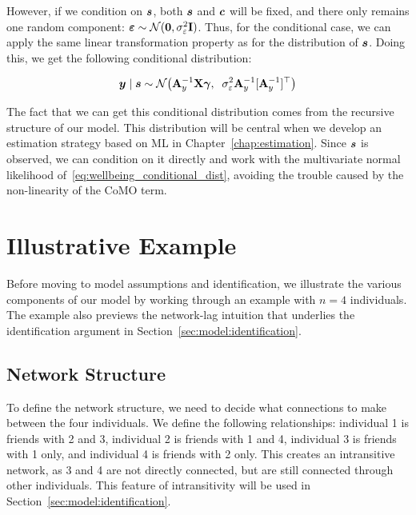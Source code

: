 However, if we condition on $\bm{s}$, both $\bm{s}$ and $\bm{c}$ will be fixed, and there only remains one random component: $\bm{\varepsilon} \sim \mathcal{N}(\bm{0}, \sigma_\varepsilon^2\mathbf{I})$. Thus, for the conditional case, we can apply the same linear transformation property as for the distribution of $\bm{s}$. Doing this, we get the following conditional distribution:

\begin{equation}
\label{eq:wellbeing_conditional_dist}
    \bm{y} \mid \bm{s} \sim \mathcal{N}\!\left(\mathbf{A}_y^{-1}\mathbf{X}\bm{\gamma}, \;\;
    \sigma_\varepsilon^2 \mathbf{A}_y^{-1}[\mathbf{A}_y^{-1}]^\top\right)
\end{equation}

The fact that we can get this conditional distribution comes from the recursive structure of our model. This distribution will be central when we develop an estimation strategy based on ML in Chapter~\ref{chap:estimation}. Since $\bm{s}$ is observed, we can condition on it directly and work with the multivariate normal likelihood of~\eqref{eq:wellbeing_conditional_dist}, avoiding the trouble caused by the non-linearity of the CoMO term.

\section{Illustrative Example}
\label{sec:model:example}
Before moving to model assumptions and identification, we illustrate the various components of our model by working through an example with $n = 4$ individuals. The example also previews the network-lag intuition that underlies the identification argument in Section~\ref{sec:model:identification}.

\subsection{Network Structure}

To define the network structure, we need to decide what connections to make between the four individuals. We define the following relationships: individual 1 is friends with 2 and 3, individual 2 is friends with 1 and 4, individual 3 is friends with 1 only, and individual 4 is friends with 2 only. This creates an intransitive network, as 3 and 4 are not directly connected, but are still connected through other individuals. This feature of intransitivity will be used in Section~\ref{sec:model:identification}.

